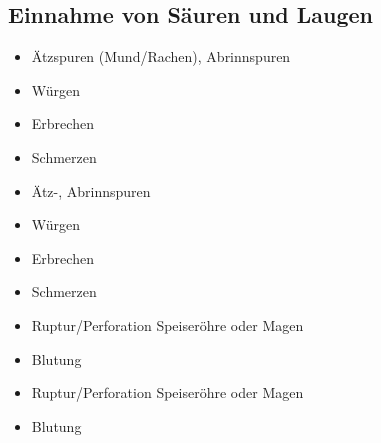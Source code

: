 {\subsection{Einnahme von Säuren und Laugen}
\label{topic:veraetzung-intoxikation}




% 
% 

{
\begin{itemize}
    \item Ätzspuren (Mund/Rachen), Abrinnspuren
    \item Würgen
    \item Erbrechen
    \item Schmerzen
\end{itemize}
}{%
\begin{itemize}
  \item Ätz-, Abrinnspuren
  \item Würgen
  \item Erbrechen
  \item Schmerzen
\end{itemize}
}{}{}{}

{%
\begin{itemize}
  \item Ruptur/Perforation Speiseröhre oder Magen
  \item Blutung
\end{itemize}
}{
\begin{itemize}
  \item Ruptur/Perforation Speiseröhre oder Magen
  \item Blutung
\end{itemize}
}{}{}{}





}

